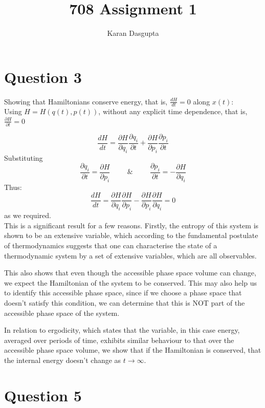 \documentclass[a4paper, 12pt]{article}
\title{708 Assignment 1}
\date{}
\author{Karan Dasgupta}
\begin{document}
\maketitle


\section*{Question 3}
Showing that Hamiltonians conserve energy, that is, $\frac{dH}{dt} = 0 $ along $x(t)$:\\
Using $H=H(q(t),p(t))$, without any explicit time dependence, that is, $\frac{\partial H}{\partial t} = 0 $

$$ \frac{dH}{dt} = \frac{\partial H}{\partial q_i} \frac{\partial q_i}{\partial t} + \frac{\partial H}{\partial p_i} \frac{\partial p_i}{\partial t}
$$
Substituting $$ \frac{\partial q_i}{\partial t} = \frac{\partial H}{\partial p_i}  \hspace{1cm} \& \hspace{1cm} \frac{\partial p_i}{\partial t} = - \frac{\partial H}{\partial q_i} $$
Thus:
$$ \frac{dH}{dt} = \frac{\partial H}{\partial q_i}\frac{\partial H}{\partial p_i} - \frac{\partial H}{\partial p_i} \frac{\partial H}{\partial q_i} = 0 
$$
as we required. \\

This is a significant result for a few reasons. Firstly, the entropy of this system is shown to be an extensive variable, which according to the fundamental postulate of thermodynamics suggests that one can characterise the state of a thermodynamic system by a set of extensive variables, which are all observables.

This also shows that even though the accessible phase space volume can change, we expect the Hamiltonian of the system to be conserved. This may also help us to identify this accessible phase space, since if we choose a phase space that doesn't satisfy this condition, we can determine that this is NOT part of the accessible phase space of the system. 

In relation to ergodicity, which states that the variable, in this case energy, averaged over periods of time, exhibits similar behaviour to that over the accessible phase space volume, we show that if the Hamiltonian is conserved, that the internal energy doesn't change as $t \rightarrow \infty$. 
\newpage
\section*{Question 5}
\end{document}
